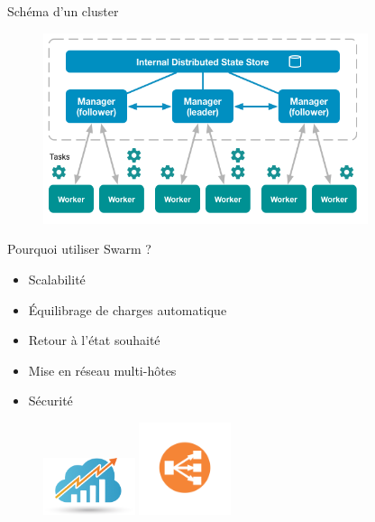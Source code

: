 \documentclass{cubeamer}
\begin{document}
\begin{frame}{Schéma d'un cluster}
    \begin{figure}
        \centering
        \includegraphics[width=0.85\textwidth]{img/swarm-network}
    \end{figure}
\end{frame}

\begin{frame}{Pourquoi utiliser Swarm ?}
    \begin{multicols}{2}
        \begin{itemize}
            \item Scalabilité
            \item Équilibrage de charges automatique
            \item Retour à l'état souhaité
            \item Mise en réseau multi-hôtes
            \item Sécurité
        \end{itemize}
    \columnbreak
        \begin{figure}
            \centering
            \includegraphics[width=0.24\textwidth]{img/scalability}
            \includegraphics[width=0.24\textwidth]{img/load-balancing}
        \end{figure}
    \end{multicols}
\end{frame}
\end{document}
